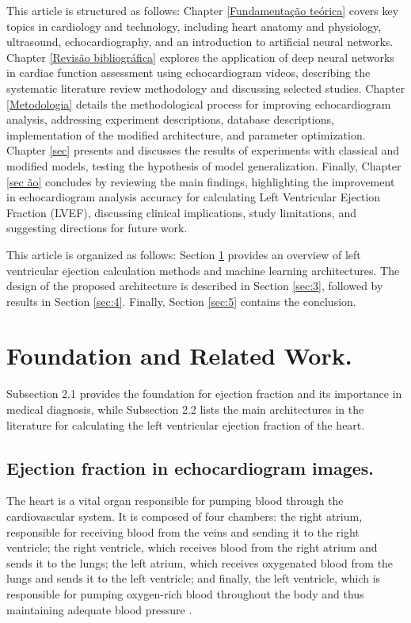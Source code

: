 \documentclass[a4paper,fleqn]{cas-dc}
\begin{document}
This article is structured as follows: Chapter \ref{Fundamentação teórica} covers key topics in cardiology and technology, including heart anatomy and physiology, ultrasound, echocardiography, and an introduction to artificial neural networks. Chapter \ref{Revisão bibliográfica} explores the application of deep neural networks in cardiac function assessment using echocardiogram videos, describing the systematic literature review methodology and discussing selected studies. Chapter \ref{Metodologia} details the methodological process for improving echocardiogram analysis, addressing experiment descriptions, database descriptions, implementation of the modified architecture, and parameter optimization. Chapter \ref{sec} presents and discusses the results of experiments with classical and modified models, testing the hypothesis of model generalization. Finally, Chapter \ref{sec ão} concludes by reviewing the main findings, highlighting the improvement in echocardiogram analysis accuracy for calculating Left Ventricular Ejection Fraction (LVEF), discussing clinical implications, study limitations, and suggesting directions for future work.

This article is organized as follows: Section \ref{sec:2} provides an overview of left ventricular ejection calculation methods and machine learning architectures. The design of the proposed architecture is described in Section \ref{sec:3}, followed by results in Section \ref{sec:4}. Finally, Section \ref{sec:5} contains the conclusion.

\section{Foundation and Related Work.} \label{sec:2}

Subsection 2.1 provides the foundation for ejection fraction and its importance in medical diagnosis, while Subsection 2.2 lists the main architectures in the literature for calculating the left ventricular ejection fraction of the heart.

\subsection{Ejection fraction in echocardiogram images.}

The heart is a vital organ responsible for pumping blood through the cardiovascular system. It is composed of four chambers: the right atrium, responsible for receiving blood from the veins and sending it to the right ventricle; the right ventricle, which receives blood from the right atrium and sends it to the lungs; the left atrium, which receives oxygenated blood from the lungs and sends it to the left ventricle; and finally, the left ventricle, which is responsible for pumping oxygen-rich blood throughout the body and thus maintaining adequate blood pressure \cite{hoffman}.
\end{document}
